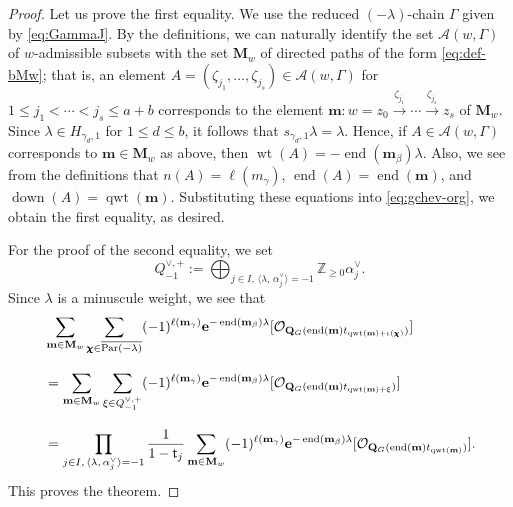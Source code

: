 \documentclass[11pt,a4paper,reqno,dvipdfmx]{amsart}
\numberwithin{equation}{section}
\newcommand{\BZ}{\mathbb{Z}}
\newcommand{\CA}{\mathcal{A}}
\newcommand{\CO}{\mathcal{O}}
\newcommand{\st}{\mathsf{t}}
\newcommand{\be}{\mathbf{e}}
\newcommand{\bm}{\mathbf{m}}
\newcommand{\bM}{\mathbf{M}}
\DeclareMathOperator{\wt}{wt}
\DeclareMathOperator{\qwt}{qwt}
\DeclareMathOperator{\ed}{end}
\DeclareMathOperator{\dnn}{down}
\newcommand{\edge}[1]{ \xrightarrow{\hspace{2pt}#1\hspace{2pt}} }
\newcommand{\ol}[1]{\overline{#1}}
\newcommand{\pair}[2]{\langle #1,\,#2 \rangle}
\newcommand{\QG}{\mathbf{Q}_{G}}
\newcommand{\SQG}[1]{[\CO_{\QG(#1)}]}
\newcommand{\bchi}{\pmb{\chi}}
\newcommand{\Par}{\mathop{\rm Par}\nolimits}
\theoremstyle{plain}
\theoremstyle{definition}
\theoremstyle{remark}
\begin{document}
\begin{proof}
Let us prove the first equality. 
We use the reduced $(-\lambda)$-chain $\Gamma$ given by \eqref{eq:GammaJ}. 
By the definitions, we can naturally identify the set $\CA(w,\Gamma)$ of 
$w$-admissible subsets with the set $\bM_{w}$ of directed paths of the form \eqref{eq:def-bMw}; 
that is, an element $A=(\zeta_{j_1},\dots,\zeta_{j_s}) \in \CA(w,\Gamma)$ for 
$1 \le j_1 < \cdots < j_s \le a+b$ corresponds to the element 
$\bm:w=z_{0} \edge{\zeta_{j_1}} \cdots \edge{\zeta_{j_s}} z_{s}$ of $\bM_{w}$. 
%
Since $\lambda \in H_{\gamma_{d},1}$ for $1 \le d \le b$, it follows that 
$s_{\gamma_{d},1}\lambda = \lambda$. 
Hence, if $A \in \CA(w,\Gamma)$ corresponds to 
$\bm \in \bM_{w}$ as above, then $\wt(A) = - \ed(\bm_{\beta})\lambda$. 
Also, we see from the definitions that $n(A) = \ell(m_{\gamma})$, $\ed(A) = \ed(\bm)$, and 
$\dnn(A)=\qwt(\bm)$. Substituting these equations into \eqref{eq:gchev-org}, 
we obtain the first equality, as desired. 

For the proof of the second equality, we set 
%
\begin{equation*}
Q^{\vee,+}_{-1}:=\bigoplus_{
  j \in I,\,
  \pair{\lambda}{\alpha_{j}^{\vee}} = -1 } \BZ_{\ge 0} \alpha_{j}^{\vee}.
\end{equation*}
%
Since $\lambda$ is a minuscule weight, we see that 
%
\begin{align*}
& \sum_{\bm \in \bM_{w}}
  \sum_{ \bchi \in \ol{\Par(-\lambda)} }
  (-1)^{\ell(\bm_{\gamma})} \be^{ - \ed(\bm_{\beta}) \lambda }
  \SQG{ \ed(\bm)t_{\qwt(\bm)+\iota(\bchi)} } \\[3mm]
%
& = \sum_{\bm \in \bM_{w}}
  \sum_{ \xi \in Q^{\vee,+}_{-1} } 
  (-1)^{\ell(\bm_{\gamma})} \be^{ - \ed(\bm_{\beta}) \lambda }
  \SQG{ \ed(\bm)t_{ \qwt(\bm)+\xi } } \\[3mm]
%
& = \prod_{ j \in I,\,
  \pair{\lambda}{\alpha_{j}^{\vee}} = -1 }
  \frac{1}{1-\st_{j}} \sum_{\bm \in \bM_{w}}
  (-1)^{\ell(\bm_{\gamma})} \be^{ - \ed(\bm_{\beta}) \lambda }
  \SQG{ \ed(\bm)t_{\qwt(\bm)} }.
\end{align*}
%
This proves the theorem. 
\end{proof}
\end{document}
